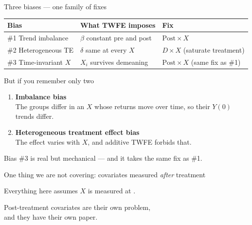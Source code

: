 \documentclass[aspectratio=169,11pt]{beamer}
\begin{document}
\begin{frame}{Three biases --- one family of fixes}
\vspace{0.3em}
{\small
\begin{tabular}{@{}lll@{}}
\toprule
\textbf{Bias} & \textbf{What TWFE imposes} & \textbf{Fix} \\
\midrule
\#1 Trend imbalance
  & $\beta$ constant pre and post
  & $\mathrm{Post}\times X$ \\[4pt]
\#2 Heterogeneous TE
  & $\delta$ same at every $X$
  & $D\times X$ (saturate treatment) \\[4pt]
\#3 Time-invariant $X$
  & $X_i$ survives demeaning
  & $\mathrm{Post}\times X$ (same fix as \#1) \\
\bottomrule
\end{tabular}
}
\end{frame}

\begin{frame}{But if you remember only two}
\vspace{1.2em}
\begin{enumerate}\setlength\itemsep{1.1em}
  \item[\textbf{1.}] \Large \textbf{Imbalance bias} \\[0.3em]
        {\normalsize\color{warmgray} The groups differ in an $X$ whose returns move over time, so their $Y(0)$ trends differ.}
  \item[\textbf{2.}] \Large \textbf{Heterogeneous treatment effect bias} \\[0.3em]
        {\normalsize\color{warmgray} The effect varies with $X$, and additive TWFE forbids that.}
\end{enumerate}
\vspace{1em}
\begin{center}\color{warmgray}\small
Bias \#3 is real but mechanical --- and it takes the same fix as \#1.
\end{center}
\end{frame}

\begin{frame}{One thing we are not covering: covariates measured \textit{after} treatment}
\vspace{1.6em}
\begin{center}
\Large
Everything here assumes $X$ is measured at .
\end{center}
\vspace{1.4em}
\begin{center}
Post-treatment covariates are their own problem, \\ and they have their own paper.
\end{center}
\vspace{1.2em}
\end{frame}
\end{document}
